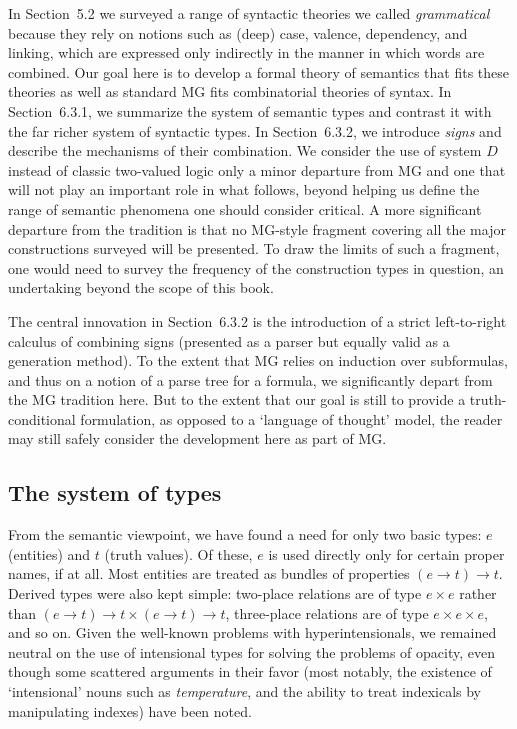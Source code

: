 In Section~5.2 we surveyed a range of syntactic theories we called {\it
  grammatical} because they rely on notions such as (deep) case, valence,
dependency, and linking, which are expressed only indirectly in the manner in
which words are combined.  Our goal here is to develop a formal theory of
semantics that fits these theories as well as standard MG fits combinatorial
theories of syntax. In Section~6.3.1, we summarize the system of semantic
types and contrast it with the far richer system of syntactic types. In
Section~6.3.2, we introduce {\it signs} and describe the mechanisms of their
combination. We consider the use of system $D$ instead of classic two-valued
logic only a minor departure from MG and one that will not play an important
role in what follows, beyond helping us define the range of semantic phenomena
one should consider critical. A more significant departure from the tradition
is that no MG-style fragment covering all the major constructions surveyed
will be presented. To draw the limits of such a fragment, one would need to
survey the frequency of the construction types in question, an undertaking
beyond the scope of this book.

The central innovation in Section~6.3.2 is the introduction of a strict
left-to-right calculus of combining signs (presented as a parser but equally
valid as a generation method). To the extent that MG relies on induction over
subformulas, and thus on a notion of a parse tree for a formula, we
significantly depart from the MG tradition here. But to the extent that our
goal is still to provide a truth-conditional formulation, as opposed to a
`language of thought' model, the reader may still safely consider the
development here as part of MG.

\subsection{The system of types}

From the semantic viewpoint, we have found a need for only two basic types:
$e$ (entities) and $t$ (truth values). Of these, $e$ is used directly only for
certain proper names, if at all. Most entities are treated as bundles of
properties $(e \rightarrow t) \rightarrow t$. Derived types were also kept
simple: two-place relations are of type $e \times e$ rather than $(e
\rightarrow t) \rightarrow t \times (e \rightarrow t) \rightarrow t$,
three-place relations are of type $e \times e \times e$, and so on. Given the
well-known problems with hyperintensionals, we remained neutral on the use of
intensional types for solving the problems of opacity, even though some
scattered arguments in their favor (most notably, the existence of
`intensional' nouns such as {\it temperature}, and the ability to treat
indexicals by manipulating indexes) have been noted.

